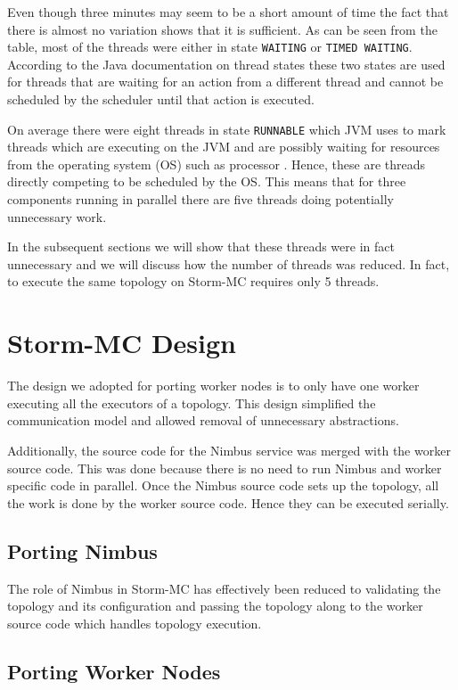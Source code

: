 \documentclass[bsc,logo,frontabs,twoside,singlespacing,normalheadings,parskip]{infthesis}\usepackage[]{graphicx}\usepackage[]{color}
\begin{document}
Even though three minutes may seem to be a short amount of time the fact that there is almost no variation shows that it is sufficient. As can be seen from the table, most of the threads were either in state \texttt{WAITING} or \texttt{TIMED WAITING}. According to the Java documentation on thread states \citep{JavaThreads} these two states are used for threads that are waiting for an action from a different thread and cannot be scheduled by the scheduler until that action is executed.

On average there were eight threads in state \texttt{RUNNABLE} which JVM uses to mark threads which are executing on the JVM and are possibly waiting for resources from the operating system (OS) such as processor \citep{JavaThreads}. Hence, these are threads directly competing to be scheduled by the OS. This means that for three components running in parallel there are five threads doing potentially unnecessary work.

In the subsequent sections we will show that these threads were in fact unnecessary and we will discuss how the number of threads was reduced. In fact, to execute the same topology on Storm-MC requires only 5 threads.

\section{Storm-MC Design}
\label{sec:storm_mc_arch}

The design we adopted for porting worker nodes is to only have one worker executing all the executors of a topology. This design simplified the communication model and allowed removal of unnecessary abstractions.

Additionally, the source code for the Nimbus service was merged with the worker source code. This was done because there is no need to run Nimbus and worker specific code in parallel. Once the Nimbus source code sets up the topology, all the work is done by the worker source code. Hence they can be executed serially.

\subsection{Porting Nimbus}

The role of Nimbus in Storm-MC has effectively been reduced to validating the topology and its configuration and passing the topology along to the worker source code which handles topology execution.

\subsection{Porting Worker Nodes}
\end{document}
